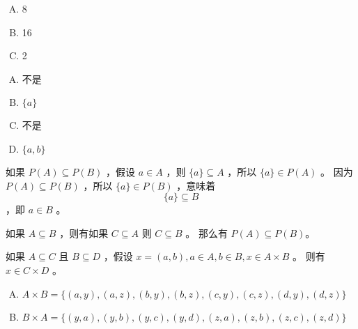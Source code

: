 {{        %
        \begin{practices}
            \begin{enumerate}[A.]
                \item 8
                \item 16
                \item 2
            \end{enumerate}
        \end{practices}

        \begin{practices}
            \begin{enumerate}[A.]
                \item 不是
                \item $\{a\}$
                \item 不是
                \item $\{a, b\}$
            \end{enumerate}
        \end{practices}

        \begin{practices}
            如果 $P(A) \subseteq P(B)$ ，假设 $a \in A$ ，则 $\{a\} \subseteq A$ ，所以 $\{a\} \in P(A)$ 。
            因为 $P(A) \subseteq P(B)$ ，所以 $\{a\} \in P(B)$ ，意味着 $$\{a\} \subseteq B$$ ，即 $a \in B$ 。

            如果 $A \subseteq B$ ，则有如果 $C \subseteq A$ 则 $C \subseteq B$ 。
            那么有 $P(A) \subseteq P(B)$。
        \end{practices}

        \begin{practices}
            如果 $A \subseteq C$ 且 $B \subseteq D$ ，假设 $x = (a, b), a \in A, b \in B, x \in A \times B$ 。
            则有 $x \in C \times D$ 。
        \end{practices}

        \begin{practices}
            \begin{enumerate}[A.]
                \item $A \times B = \{(a, y), (a, z), (b, y), (b, z), (c, y), (c, z), (d, y), (d, z)\}$
                \item $B \times A = \{(y, a), (y, b), (y, c), (y, d), (z, a), (z, b), (z, c), (z, d)\}$
            \end{enumerate}
        \end{practices}

}}
